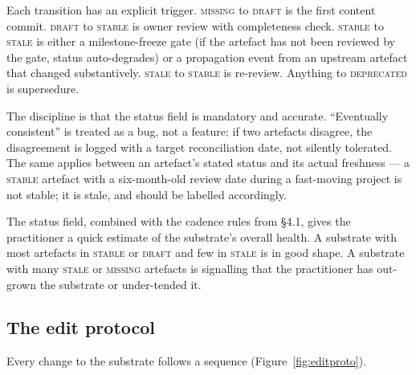 \documentclass[11pt,a4paper,twocolumn]{article}
\begin{document}
Each transition has an explicit trigger. \textsc{missing} to
\textsc{draft} is the first content commit. \textsc{draft} to
\textsc{stable} is owner review with completeness check.
\textsc{stable} to \textsc{stale} is either a milestone-freeze gate
(if the artefact has not been reviewed by the gate, status
auto-degrades) or a propagation event from an upstream artefact
that changed substantively. \textsc{stale} to \textsc{stable} is
re-review. Anything to \textsc{deprecated} is supersedure.

The discipline is that the status field is mandatory and accurate.
``Eventually consistent'' is treated as a bug, not a feature: if
two artefacts disagree, the disagreement is logged with a target
reconciliation date, not silently tolerated. The same applies
between an artefact's stated status and its actual freshness --- a
\textsc{stable} artefact with a six-month-old review date during a
fast-moving project is not stable; it is stale, and should be
labelled accordingly.

The status field, combined with the cadence rules from \S4.1, gives
the practitioner a quick estimate of the substrate's overall
health. A substrate with most artefacts in \textsc{stable} or
\textsc{draft} and few in \textsc{stale} is in good shape. A
substrate with many \textsc{stale} or \textsc{missing} artefacts is
signalling that the practitioner has out-grown the substrate or
under-tended it.

\subsection{The edit protocol}

Every change to the substrate follows a sequence
(Figure~\ref{fig:editproto}).
\end{document}
